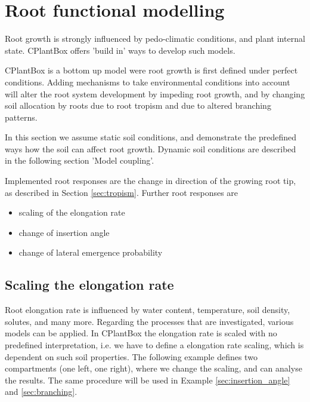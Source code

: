 \newpage
\section{Root functional modelling} \label{sec:functional}

Root growth is strongly influenced by pedo-climatic conditions, and plant internal state. CPlantBox offers 'build in' ways to develop such models. 

CPlantBox is a bottom up model were root growth is first defined under perfect conditions. Adding mechanisms to take environmental conditions into account will alter the root system development by impeding root growth, and by changing soil allocation by roots due to root tropism and due to altered branching patterns.

In this section we assume static soil conditions, and demonstrate the predefined ways how the soil can affect root growth.
Dynamic soil conditions are described in the following section 'Model coupling'. 

Implemented root responses are the change in direction of the growing root tip, as described in Section \ref{sec:tropism}.
Further root responses are 
\begin{itemize}
 \item scaling of the elongation rate 
 \item change of insertion angle
 \item change of lateral emergence probability
\end{itemize}

\subsection{Scaling the elongation rate} \label{sec:elongation}

Root elongation rate is influenced by water content, temperature, soil density, solutes, and many more. Regarding the processes that are investigated, various models can be applied. In CPlantBox the elongation rate is scaled with no predefined interpretation, i.e. we have to define a elongation rate scaling, which is dependent on such soil properties. The following example defines two compartments (one left, one right), where we change the scaling, and can analyse the results. The same procedure will be used in Example \ref{sec:insertion_angle} and \ref{sec:branching}.



